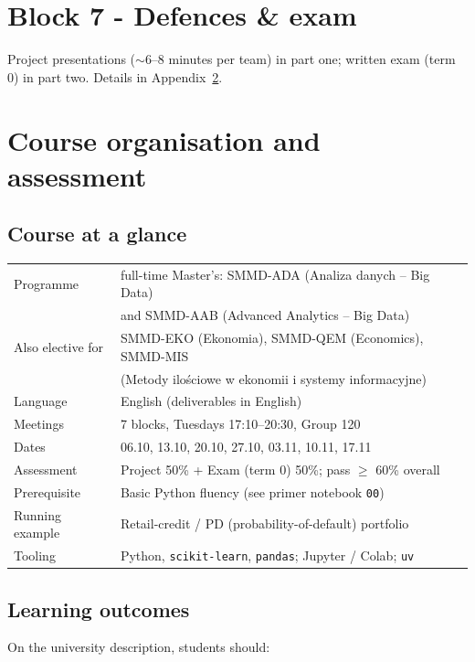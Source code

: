 \documentclass[11pt,a4paper]{article}
\begin{document}
\section{Block 7 - Defences \& exam}
Project presentations ($\sim$6--8 minutes per team) in part one; written exam
(term 0) in part two. Details in Appendix~\ref{app:org}.

\appendix
\section{Course organisation and assessment}
\label{app:org}

\subsection{Course at a glance}
\begin{center}
\begin{tabular}{@{}ll@{}}
\toprule
Programme & full-time Master's: SMMD-ADA (Analiza danych -- Big Data) \\
          & and SMMD-AAB (Advanced Analytics -- Big Data) \\
Also elective for & SMMD-EKO (Ekonomia), SMMD-QEM (Economics), SMMD-MIS \\
          & (Metody ilo\'sciowe w ekonomii i systemy informacyjne) \\
Language & English (deliverables in English) \\
Meetings & 7 blocks, Tuesdays 17:10--20:30, Group 120 \\
Dates & 06.10, 13.10, 20.10, 27.10, 03.11, 10.11, 17.11 \\
Assessment & Project 50\% + Exam (term 0) 50\%; pass $\geq$ 60\% overall \\
Prerequisite & Basic Python fluency (see primer notebook \texttt{00}) \\
Running example & Retail-credit / PD (probability-of-default) portfolio \\
Tooling & Python, \texttt{scikit-learn}, \texttt{pandas}; Jupyter / Colab; \texttt{uv} \\
\bottomrule
\end{tabular}
\end{center}

\subsection{Learning outcomes}
On the university description, students should:
\end{document}
